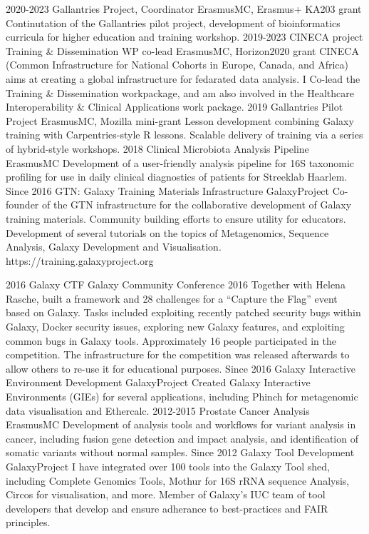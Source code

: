 \documentclass[]{shiltemann-cv}
\begin{document}
\begin{entrylist}
   \entry
    {2020-2023}
    {Gallantries Project, Coordinator}
    {ErasmusMC, Erasmus+ KA203 grant}
    {Continutation of the Gallantries pilot project, development of bioinformatics curricula for higher education and training workshop.}
   \entry
    {2019-2023}
    {CINECA project Training \& Dissemination WP co-lead}
    {ErasmusMC, Horizon2020 grant}
    {CINECA (Common Infrastructure for National Cohorts in Europe, Canada, and Africa) aims at creating a global infrastructure for fedarated data analysis. I Co-lead the Training \& Dissemination  workpackage, and am also involved in the Healthcare Interoperability \& Clinical Applications work package.}
   \entry
    {2019}
    {Gallantries Pilot Project}
    {ErasmusMC, Mozilla mini-grant}
    {Lesson development combining Galaxy training with Carpentries-style R lessons. Scalable delivery of training via a series of hybrid-style workshops.}
  \entry
    {2018}
    {Clinical Microbiota Analysis Pipeline}
    {ErasmusMC}
    {Development of a user-friendly analysis pipeline for 16S taxonomic profiling for use in daily clinical diagnostics of patients for Streeklab Haarlem.}
  \entry
    {Since 2016}
    {GTN: Galaxy Training Materials Infrastructure}
    {GalaxyProject}
    {Co-founder of the GTN infrastructure for the collaborative development of Galaxy training materials. Community building efforts to ensure utility for educators.  Development of several tutorials on the topics of Metagenomics, Sequence Analysis, Galaxy Development and Visualisation. https://training.galaxyproject.org }


  \entry
    {2016}
    {Galaxy CTF}
    {Galaxy Community Conference 2016}
    {Together with Helena Rasche, built a framework and 28 challenges for a “Capture the Flag” event based on Galaxy. Tasks included exploiting recently patched security bugs within Galaxy, Docker security issues, exploring new Galaxy features, and exploiting common bugs in Galaxy tools. Approximately 16 people participated in the competition. The infrastructure for the competition was released afterwards to allow others to re-use it for educational purposes.}
   \entry
     {Since 2016}
     {Galaxy Interactive Environment Development}
     {GalaxyProject}
     {Created Galaxy Interactive Environments (GIEs) for several applications, including Phinch for metagenomic data visualisation and Ethercalc.}
   \entry
     {2012-2015}
     {Prostate Cancer Analysis}
     {ErasmusMC}
     {Development of analysis tools and workflows for variant analysis in cancer, including fusion gene detection and impact analysis, and identification of somatic variants without normal samples.}
   \entry
    {Since 2012}
    {Galaxy Tool Development}
    {GalaxyProject}
    {I have integrated over 100 tools into the Galaxy Tool shed, including Complete Genomics Tools, Mothur for 16S rRNA sequence Analysis, Circos for visualisation, and more. Member of Galaxy's IUC team of tool developers that develop and ensure adherance to best-practices and FAIR principles.}
\end{entrylist}
\newpage
\end{document}
